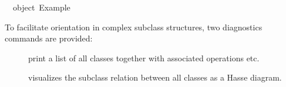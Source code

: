 \begin{isabellebody}
\begin{isamarkuptext}
\isanewline
{}\ {}{}\ object\ Example\ {}{}\isanewline%
\end{isamarkuptext}%
\isamarkuptrue%
%
\endisatagquotetypewriter
{\isafoldquotetypewriter}%
%
\isadelimquotetypewriter
%
\endisadelimquotetypewriter
%
\isamarkuptrue%
%
\begin{isamarkuptext}%
To facilitate orientation in complex subclass structures, two
  diagnostics commands are provided:

  \begin{description}

    \item[\hyperlink{command.print-classes}{\mbox{}}] print a list of all classes
      together with associated operations etc.

    \item[\hyperlink{command.class-deps}{\mbox{}}] visualizes the subclass relation
      between all classes as a Hasse diagram.

  \end{description}%
\end{isamarkuptext}%
\isamarkuptrue%
%
\isadelimtheory
%
\endisadelimtheory
%
\isatagtheory
{}\isamarkupfalse%
%
\endisatagtheory
{\isafoldtheory}%
%
\isadelimtheory
%
\endisadelimtheory
\isanewline
\end{isabellebody}%
